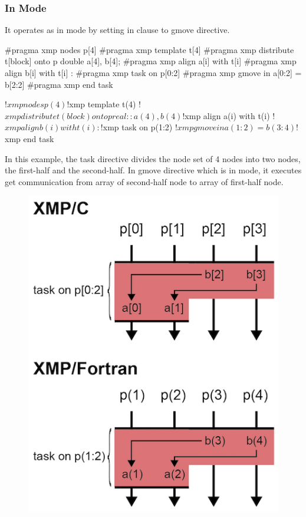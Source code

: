 \subsubsection{In Mode}

It operates as in mode by setting in clause to gmove directive.

\begin{XCexample}
#pragma xmp nodes p[4]
#pragma xmp template t[4]
#pragma xmp distribute t[block] onto p
double a[4], b[4];
#pragma xmp align a[i] with t[i]
#pragma xmp align b[i] with t[i]
   :
#pragma xmp task on p[0:2]
#pragma xmp gmove in
  a[0:2] = b[2:2]
#pragma xmp end task
\end{XCexample}

\begin{XFexample}
!$xmp nodes p(4)
!$xmp template t(4)
!$xmp distribute t(block) onto p
real :: a(4), b(4)
!$xmp align a(i) with t(i)
!$xmp align b(i) with t(i)
   :
!$xmp task on p(1:2)
!$xmp gmove in
  a(1:2) = b(3:4)
!$xmp end task
\end{XFexample}

In this example, the task directive divides the node set of 4 nodes into
two nodes, the first-half and the second-half. In gmove directive which
is in mode, it executes get communication from array of second-half node
to array of first-half node.

\begin{figure}
  \centering
  \includegraphics{figs/gmove_in.png}
\end{figure}


